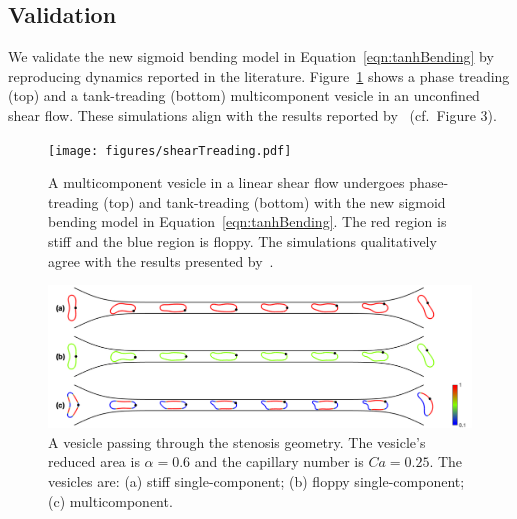 \documentclass[twoside,twocolumn,9pt]{article}
\newcommand{\subfigimg}[3][,]{%
  \setbox1=\hbox{\texttt{[image: \#3]}}%
  \leavevmode\rlap{\usebox1}%
  \rlap{\hspace*{0pt}\raisebox{\dimexpr\ht1-0\baselineskip}{\bf
  \normalsize #2}}%
  \phantom{\usebox1}%
}
\begin{document}
\subsection{Validation}
\label{sec:validation}
We validate the new sigmoid bending model in
Equation~\eqref{eqn:tanhBending} by reproducing dynamics reported in the
literature. Figure~\ref{fig:treading} shows a phase treading (top) and a
tank-treading (bottom) multicomponent vesicle in an unconfined shear
flow. These simulations align with the results reported
by~\citet{liu-mar-li-vee-low2017} (cf.~Figure 3).
\begin{figure}[h]
  \centering
  \texttt{[image: figures/shearTreading.pdf]}
  \caption{\label{fig:treading} \small A multicomponent vesicle in a
  linear shear flow undergoes phase-treading (top) and tank-treading
  (bottom) with the new sigmoid bending model in
  Equation~\eqref{eqn:tanhBending}. The red region is stiff and the blue
  region is floppy. The simulations qualitatively agree with the results
  presented by~\citet{liu-mar-li-vee-low2017}.}
\end{figure}


\begin{figure}[h]
  \centering
  \includegraphics[width=0.9\linewidth]{figures/STENOSIS_RAp6MCp5.pdf}
  \caption{\label{fig:RA6} \small A vesicle passing through the stenosis
  geometry. The vesicle's reduced area is $\alpha = 0.6$ and the
  capillary number is $Ca = 0.25$. The vesicles are: (a) stiff
  single-component; (b) floppy single-component; (c) multicomponent.}
\end{figure}
\end{document}
